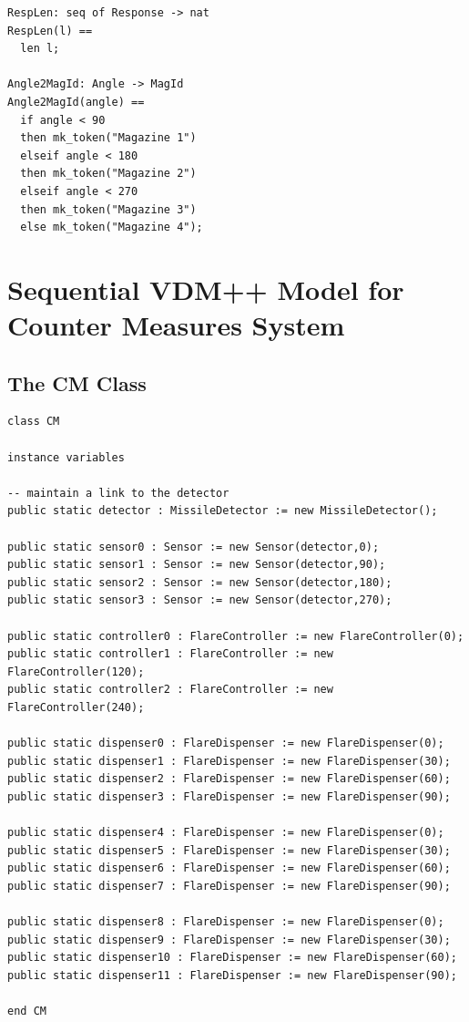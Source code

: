 \documentclass{overturerepchap}
\begin{document}
\begin{lstlisting}
RespLen: seq of Response -> nat
RespLen(l) ==
  len l;

Angle2MagId: Angle -> MagId
Angle2MagId(angle) ==
  if angle < 90
  then mk_token("Magazine 1")
  elseif angle < 180
  then mk_token("Magazine 2")
  elseif angle < 270
  then mk_token("Magazine 3")
  else mk_token("Magazine 4");
\end{lstlisting}

\section{Sequential VDM++ Model for Counter Measures System}

\subsection{The CM Class}

\begin{lstlisting}
class CM

instance variables

-- maintain a link to the detector
public static detector : MissileDetector := new MissileDetector();

public static sensor0 : Sensor := new Sensor(detector,0);
public static sensor1 : Sensor := new Sensor(detector,90);
public static sensor2 : Sensor := new Sensor(detector,180);
public static sensor3 : Sensor := new Sensor(detector,270);

public static controller0 : FlareController := new FlareController(0);
public static controller1 : FlareController := new FlareController(120);
public static controller2 : FlareController := new FlareController(240);

public static dispenser0 : FlareDispenser := new FlareDispenser(0);
public static dispenser1 : FlareDispenser := new FlareDispenser(30);
public static dispenser2 : FlareDispenser := new FlareDispenser(60);
public static dispenser3 : FlareDispenser := new FlareDispenser(90);

public static dispenser4 : FlareDispenser := new FlareDispenser(0);
public static dispenser5 : FlareDispenser := new FlareDispenser(30);
public static dispenser6 : FlareDispenser := new FlareDispenser(60);
public static dispenser7 : FlareDispenser := new FlareDispenser(90);

public static dispenser8 : FlareDispenser := new FlareDispenser(0);
public static dispenser9 : FlareDispenser := new FlareDispenser(30);
public static dispenser10 : FlareDispenser := new FlareDispenser(60);
public static dispenser11 : FlareDispenser := new FlareDispenser(90);

end CM
\end{lstlisting}
\end{document}
